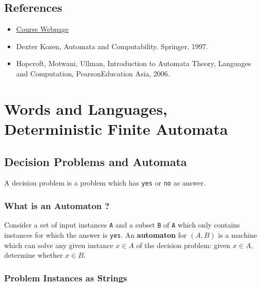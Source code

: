\documentclass{report}
\begin{document}
\section{References}
\begin{itemize}
  \item \href{https://cse.iitb.ac.in/~pandya58/CS310/automata.html}{Course Webpage}
  \item Dexter Kozen, Automata and Computability. Springer, 1997.
  \item Hopcroft, Motwani, Ullman, Introduction to Automata Theory, Languages and Computation, PearsonEducation Asia, 2006.
\end{itemize}


\chapter{Words and Languages, Deterministic Finite Automata}

\section{Decision Problems and Automata}

A decision problem is a problem which has \verb|yes| or \verb|no| as answer.

\subsection{What is an Automaton ?}

Consider a set of input instances \verb|A| and a subset \verb|B| of \verb|A| which only contains instances for which the answer is \verb|yes|. An \textbf{automaton} for $(A,B)$ is a machine which can solve any given instance $x \in A$ of the decision problem: given $x \in A$, determine whether $x \in B$.

\subsection{Problem Instances as Strings}
\end{document}
